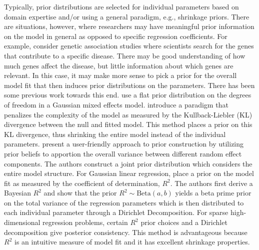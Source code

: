 \documentclass[12pt]{article}
\begin{document}
Typically, prior distributions are selected for individual parameters based on domain expertise and/or using a general paradigm, e.g., shrinkage priors. There are situations, however, where researchers may have meaningful prior information on the model in general as opposed to specific regression coefficients. For example, consider genetic association studies \citep[e.g.,][]{lewis2012introduction} where scientists search for the genes that contribute to a specific disease. There may be good understanding of how much genes affect the disease, but little information about which genes are relevant. In this case, it may make more sense to pick a prior for the overall model fit that then induces prior distributions on the parameters. There has been some previous work towards this end. \cite{hodges2001counting} use a flat prior distribution on the degrees of freedom in a Gaussian mixed effects model. \cite{simpson2017penalising} introduce a paradigm that penalizes the complexity of the model as measured by the Kullback-Liebler (KL) divergence between the null and fitted model. This method places a prior on this KL divergence, thus shrinking the entire model instead of the individual parameters.  \cite{fuglstad2020intuitive} present a user-friendly approach to prior construction by utilizing prior beliefs to apportion the overall variance between different random effect components. The authors construct a joint prior distribution which considers the entire model structure. For Gaussian linear regression, \cite{zhang2022bayesian} place a prior on the model fit as measured by the coefficient of determination, $R^2$. The authors first derive a Bayesian $R^2$ and show that the prior $R^2\sim\mbox{Beta}(a,b)$ yields a beta prime prior on the total variance of the regression parameters which is then distributed to each individual parameter through a Dirichlet Decomposition. For sparse high-dimensional regression problems, certain $R^2$ prior choices and a Dirichlet decomposition give posterior consistency. This method is advantageous because $R^2$ is an intuitive measure of model fit and it has excellent shrinkage properties.
\end{document}
